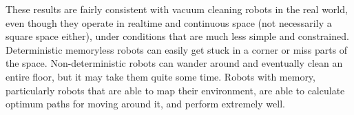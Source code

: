 \documentclass[10 pt.]{article}
\begin{document}
These results are fairly consistent with vacuum cleaning robots in the real world, even though they operate in realtime and continuous space 
(not necessarily a square space either), under conditions that are much less simple and constrained. Deterministic memoryless robots
can easily get stuck in a corner or miss parts of the space. Non-deterministic robots can wander around and eventually clean an entire floor,
but it may take them quite some time. Robots with memory, particularly robots that are able to map their environment, are able to calculate
optimum paths for moving around it, and perform extremely well. 
\end{document}
